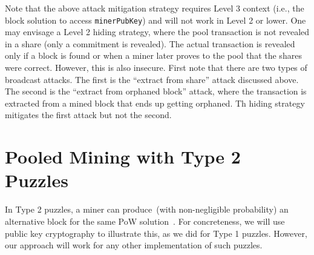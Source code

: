 \documentclass[runningheads]{llncs}
\begin{document}
Note that the above attack mitigation strategy requires Level 3 context (i.e., the block solution to access \texttt{minerPubKey}) and will not work in Level 2 or lower. One may envisage a Level 2 hiding strategy, where the pool transaction is not revealed in a share (only a commitment is revealed). The actual transaction is revealed only if a block is found or when a miner later proves to the pool that the shares were correct. However, this is also insecure. First note that there are two types of broadcast attacks. The first is the ``extract from share'' attack discussed above. The second is the ``extract from orphaned block'' attack, where the transaction is extracted from a mined block that ends up getting orphaned. Th hiding strategy mitigates the first attack but not the second. 

\section{Pooled Mining with Type 2 Puzzles}
\label{bypasstype2}

In Type 2 puzzles, a miner can produce~(with non-negligible probability) an alternative block for the same PoW solution~\cite{miller2015nonoutsourceable}.
For concreteness, we will use public key cryptography to illustrate this, as we did for Type 1 puzzles. However, our approach will work for any other implementation of such puzzles.
\end{document}
